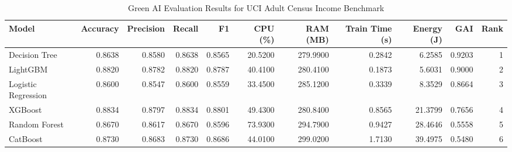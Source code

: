\begin{table}[htbp]
\caption{Green AI Evaluation Results for UCI Adult Census Income Benchmark}
\label{tab:adult_census_results}
\begin{tabular}{lrrrrrrrrrr}
\toprule
Model & Accuracy & Precision & Recall & F1 & CPU (\%) & RAM (MB) & Train Time (s) & Energy (J) & GAI & Rank \\
\midrule
Decision Tree & 0.8638 & 0.8580 & 0.8638 & 0.8565 & 20.5200 & 279.9900 & 0.2842 & 6.2585 & 0.9203 & 1 \\
LightGBM & 0.8820 & 0.8782 & 0.8820 & 0.8787 & 40.4100 & 280.4100 & 0.1873 & 5.6031 & 0.9000 & 2 \\
Logistic Regression & 0.8600 & 0.8547 & 0.8600 & 0.8559 & 33.4500 & 285.1200 & 0.3339 & 8.3529 & 0.8664 & 3 \\
XGBoost & 0.8834 & 0.8797 & 0.8834 & 0.8801 & 49.4300 & 280.8400 & 0.8565 & 21.3799 & 0.7656 & 4 \\
Random Forest & 0.8670 & 0.8617 & 0.8670 & 0.8596 & 73.9300 & 294.7900 & 0.9427 & 28.4646 & 0.5558 & 5 \\
CatBoost & 0.8730 & 0.8683 & 0.8730 & 0.8686 & 44.0100 & 299.0200 & 1.7130 & 39.4975 & 0.5480 & 6 \\
\bottomrule
\end{tabular}
\end{table}
